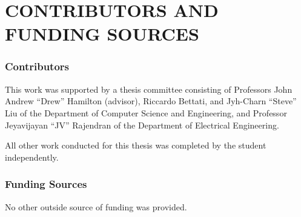 %
%
%
%
%


\chapter*{CONTRIBUTORS AND FUNDING SOURCES}

\subsection*{Contributors}
This work was supported by a thesis committee consisting of Professors John Andrew ``Drew'' Hamilton (advisor), Riccardo Bettati, and Jyh-Charn ``Steve'' Liu of the Department of Computer Science and Engineering, and Professor Jeyavijayan ``JV'' Rajendran of the Department of Electrical Engineering.


All other work conducted for this thesis was completed by the student independently.

\subsection*{Funding Sources}
No other outside source of funding was provided.

\pagebreak{}
